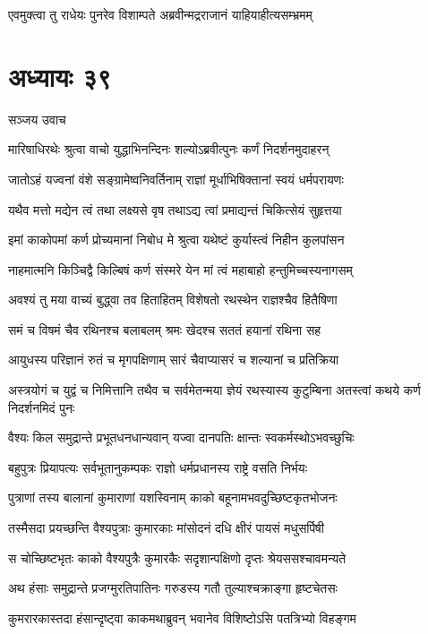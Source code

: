 \twolineshloka
{एवमुक्त्वा तु राधेयः पुनरेव विशाम्पते}
{अब्रवीन्मद्रराजानं याहियाहीत्यसम्भ्रमम्}


\chapter{अध्यायः ३९}
\twolineshloka
{सञ्जय उवाच}
{}


\twolineshloka
{मारिषाधिरथेः श्रुत्वा वाचो युद्धाभिनन्दिनः}
{शल्योऽब्रवीत्पुनः कर्णं निदर्शनमुदाहरन्}


\twolineshloka
{जातोऽहं यज्वनां वंशे सङ्ग्रामेष्वनिवर्तिनाम्}
{राज्ञां मूर्धाभिषिक्तानां स्वयं धर्मपरायणः}


\twolineshloka
{यथैव मत्तो मद्येन त्वं तथा लक्ष्यसे वृष}
{तथाऽद्य त्वां प्रमाद्यन्तं चिकित्सेयं सुहृत्तया}


\twolineshloka
{इमां काकोपमां कर्ण प्रोच्यमानां निबोध मे}
{श्रुत्वा यथेष्टं कुर्यास्त्वं निहीन कुलपांसन}


\twolineshloka
{नाहमात्मनि किञ्चिद्वै किल्बिषं कर्ण संस्मरे}
{येन मां त्वं महाबाहो हन्तुमिच्चस्यनागसम्}


\twolineshloka
{अवश्यं तु मया वाच्यं बुद्ध्वा तव हिताहितम्}
{विशेषतो रथस्थेन राज्ञश्चैव हितैषिणा}


\twolineshloka
{समं च विषमं चैव रथिनश्च बलाबलम्}
{श्रमः खेदश्च सततं हयानां रथिना सह}


\twolineshloka
{आयुधस्य परिज्ञानं रुतं च मृगपक्षिणाम्}
{सारं चैवाप्यासरं च शल्यानां च प्रतिक्रिया}


\threelineshloka
{अस्त्रयोगं च युद्वं च निमित्तानि तथैव च}
{सर्वमेतन्मया ज्ञेयं रथस्यास्य कुटुम्बिना}
{अतस्त्वां कथये कर्ण निदर्शनमिदं पुनः}


\twolineshloka
{वैश्यः किल समुद्रान्ते प्रभूतधनधान्यवान्}
{यज्वा दानपतिः क्षान्तः स्वकर्मस्थोऽभवच्छुचिः}


\twolineshloka
{बहुपुत्रः प्रियापत्यः सर्वभूतानुकम्पकः}
{राज्ञो धर्मप्रधानस्य राष्ट्रे वसति निर्भयः}


\twolineshloka
{पुत्राणां तस्य बालानां कुमाराणां यशस्विनाम्}
{काको बहूनामभवदुच्छिष्टकृतभोजनः}


\twolineshloka
{तस्मैसदा प्रयच्छन्ति वैश्यपुत्राः कुमारकाः}
{मांसोदनं दधि क्षीरं पायसं मधुसर्पिषी}


\twolineshloka
{स चोच्छिष्टभृतः काको वैश्यपुत्रैः कुमारकैः}
{सदृशान्पक्षिणो दृप्तः श्रेयससश्चावमन्यते}


\twolineshloka
{अथ हंसाः समुद्रान्ते प्रजग्मुरतिपातिनः}
{गरुडस्य गतौ तुल्याश्चक्राङ्गा हृष्टचेतसः}


\twolineshloka
{कुमरारकास्तदा हंसान्दृष्ट्वा काकमथाब्रुवन्}
{भवानेव विशिष्टोऽसि पतत्रिभ्यो विहङ्गम}



